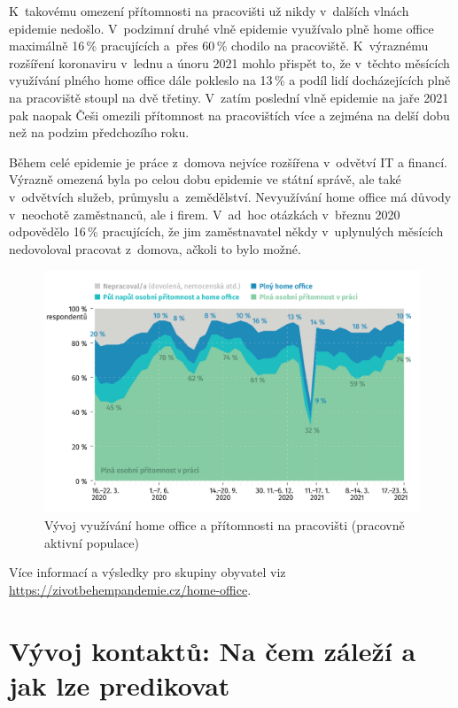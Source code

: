 K takovému omezení přítomnosti na pracovišti už nikdy v dalších vlnách epidemie nedošlo. V~podzimní druhé vlně epidemie využívalo plně home office maximálně 16\,\% pracujících a přes 60\,\% chodilo na pracoviště. K~výraznému rozšíření koronaviru v lednu a únoru 2021 mohlo přispět to, že v těchto měsících využívání plného home office dále pokleslo na 13\,\% a podíl lidí docházejících plně na pracoviště stoupl na dvě třetiny. V zatím poslední vlně epidemie na jaře 2021 pak naopak Češi omezili přítomnost na pracovištích více a zejména na delší dobu než na podzim předchozího roku.

Během celé epidemie je práce z domova nejvíce rozšířena v odvětví IT a financí. Výrazně omezená byla po celou dobu epidemie ve státní správě, ale také v odvětvích služeb, průmyslu a zemědělství. Nevyužívání home office má důvody v neochotě zaměstnanců, ale i firem. V ad hoc otázkách v březnu 2020 odpovědělo 16\,\% pracujících, že jim zaměstnavatel někdy v uplynulých měsících nedovoloval pracovat z domova, ačkoli to bylo možné.

\begin{figure}[ht]
    \centering
    \includegraphics[width=\textwidth]{./pic/zbp-graf4.png}
    \caption{Vývoj využívání home office a přítomnosti na pracovišti (pracovně aktivní populace)}
    \label{fig:zbp4}
\end{figure}

Více informací a výsledky pro skupiny obyvatel viz \url{https://zivotbehempandemie.cz/home-office}.

\section*{Vývoj kontaktů: Na čem záleží a jak lze predikovat}

